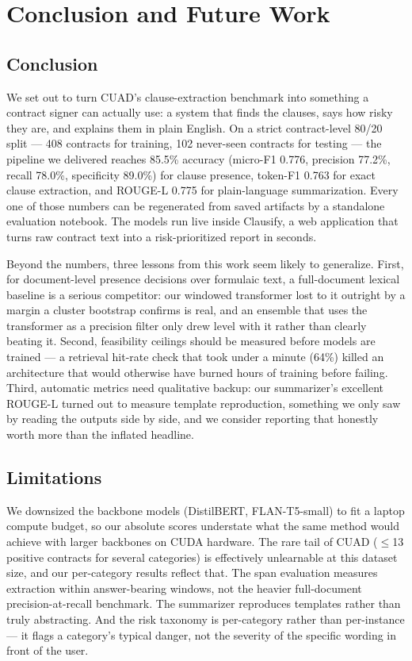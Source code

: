 \chapter{Conclusion and Future Work}

\section{Conclusion}
We set out to turn CUAD's clause-extraction benchmark into something a contract signer can actually use: a system that finds the clauses, says how risky they are, and explains them in plain English. On a strict contract-level 80/20 split --- 408 contracts for training, 102 never-seen contracts for testing --- the pipeline we delivered reaches 85.5\% accuracy (micro-F1 0.776, precision 77.2\%, recall 78.0\%, specificity 89.0\%) for clause presence, token-F1 0.763 for exact clause extraction, and ROUGE-L 0.775 for plain-language summarization. Every one of those numbers can be regenerated from saved artifacts by a standalone evaluation notebook. The models run live inside Clausify, a web application that turns raw contract text into a risk-prioritized report in seconds.

Beyond the numbers, three lessons from this work seem likely to generalize. First, for document-level presence decisions over formulaic text, a full-document lexical baseline is a serious competitor: our windowed transformer lost to it outright by a margin a cluster bootstrap confirms is real, and an ensemble that uses the transformer as a precision filter only drew level with it rather than clearly beating it. Second, feasibility ceilings should be measured before models are trained --- a retrieval hit-rate check that took under a minute (64\%) killed an architecture that would otherwise have burned hours of training before failing. Third, automatic metrics need qualitative backup: our summarizer's excellent ROUGE-L turned out to measure template reproduction, something we only saw by reading the outputs side by side, and we consider reporting that honestly worth more than the inflated headline.

\section{Limitations}
We downsized the backbone models (DistilBERT, FLAN-T5-small) to fit a laptop compute budget, so our absolute scores understate what the same method would achieve with larger backbones on CUDA hardware. The rare tail of CUAD ($\leq$13 positive contracts for several categories) is effectively unlearnable at this dataset size, and our per-category results reflect that. The span evaluation measures extraction within answer-bearing windows, not the heavier full-document precision-at-recall benchmark. The summarizer reproduces templates rather than truly abstracting. And the risk taxonomy is per-category rather than per-instance --- it flags a category's typical danger, not the severity of the specific wording in front of the user.


